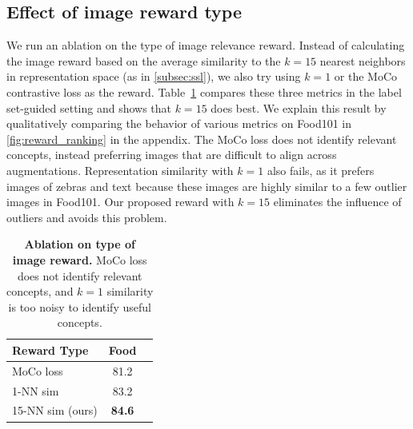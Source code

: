 \subsection{Effect of image reward type}
\label{subsec:reward_analysis}
We run an ablation on the type of image relevance reward. Instead of calculating the image reward based on the average similarity to the $k=15$ nearest neighbors in representation space (as in \cref{subsec:ssl}), we also try using $k=1$ or the MoCo contrastive loss as the reward. Table~\ref{tab:image_reward} compares these three metrics in the label set-guided setting and shows that $k=15$ does best. We explain this result by qualitatively comparing the behavior of various metrics on Food101 in \cref{fig:reward_ranking} in the appendix. The MoCo loss does not identify relevant concepts, instead preferring images that are difficult to align across augmentations. Representation similarity with $k=1$ also fails, as it prefers images of zebras and text because these images are highly similar to a few outlier images in Food101. Our proposed reward with $k=15$ eliminates the influence of outliers and avoids this problem.

\begin{table}[h]
    \centering
    \begin{tabular}{lcc}
        \toprule
        Reward Type & Food \\
        \midrule
        MoCo loss & 81.2 \\
        1-NN sim  & 83.2 \\
        15-NN sim (ours) & \textbf{84.6} \\
        \bottomrule
    \end{tabular}
    \caption{\textbf{Ablation on type of image reward.}
    MoCo loss does not identify relevant concepts, and $k=1$ similarity is too noisy to identify useful concepts. }
    \label{tab:image_reward}
\end{table}

